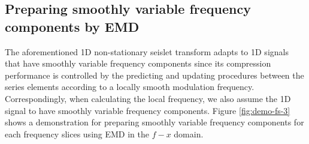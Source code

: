 

\subsection{Preparing smoothly variable frequency components by EMD}






The aforementioned 1D non-stationary seislet transform adapts to 1D signals that have smoothly variable frequency components since its compression performance is controlled by the predicting and updating procedures between the series elements according to a locally smooth modulation frequency. Correspondingly, when calculating the local frequency, we also assume the 1D signal to have smoothly variable frequency components. Figure \ref{fig:demo-fs-3} shows a demonstration for preparing smoothly variable frequency components for each frequency slices using EMD in the $f-x$ domain.






